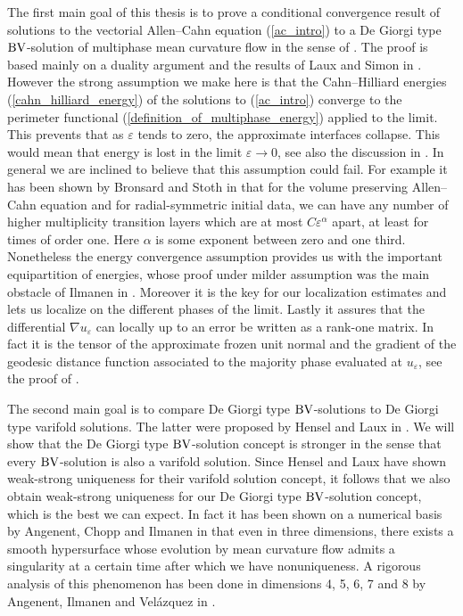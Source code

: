 The first main goal of this thesis is to prove a conditional convergence result 
of solutions to the vectorial Allen--Cahn equation (\ref{ac_intro}) to a De 
Giorgi type $ \operatorname{BV} $-solution of multiphase mean curvature flow in the sense of 
. The proof is based mainly on a duality 
argument and the results of Laux and Simon in 
\cite{convergence_of_allen_cahn_equation_to_multiphase_mean_curvature_flow}.
However the strong assumption we make here is that the Cahn--Hilliard energies 
(\ref{cahn_hilliard_energy}) of the solutions to (\ref{ac_intro}) converge to 
the perimeter functional (\ref{definition_of_multiphase_energy}) applied to the 
limit. 
This prevents that as $ \varepsilon $ tends to zero, the approximate interfaces 
collapse. This would mean that energy is lost in the limit $ \varepsilon \to 0 
$, see also the discussion in
.  In general we are 
inclined to believe that this assumption could fail. For example it has been 
shown by Bronsard and Stoth in 
\cite{bronsard_stoth_on_the_existence_of_high_multiplicity_interfaces}
that for the volume preserving Allen--Cahn equation and for radial-symmetric 
initial data, we can have any number of higher 
multiplicity transition layers which are at most $ C \varepsilon^{ \alpha } $ 
apart, at least for times of order one.
Here $ \alpha $ is some exponent between zero and one third.
Nonetheless the energy 
convergence assumption provides us with the important equipartition of 
energies, whose proof under milder assumption was the main obstacle of Ilmanen 
in \cite{ilmanen_convergence_of_ac_to_brakkes_mcf}. Moreover it is the key for 
our localization estimates and lets us localize on the different phases of the 
limit. Lastly it assures that the differential $ \nabla u_{ 
\varepsilon } $ can locally up to an error be written as a rank-one matrix. In 
fact it
is the tensor of the approximate frozen unit normal and the gradient of the 
geodesic 
distance function associated to the majority phase evaluated at $ u_{ 
\varepsilon } $, see the proof of .

The second main goal is to compare De Giorgi type $ \operatorname{BV} $-solutions to De 
Giorgi type varifold solutions.
The latter were 
proposed by Hensel and Laux in 
\cite{hensel_laux_varifold_solution_concept_for_mean_curvature_flow}. We will 
show that the De Giorgi type $ \operatorname{BV} $-solution concept is stronger in the sense 
that every $ \operatorname{BV} 
$-solution is also a varifold solution. 
Since Hensel and Laux have shown 
weak-strong uniqueness for their varifold solution concept, it follows that we 
also obtain weak-strong uniqueness for our De Giorgi type $ \operatorname{BV} $-solution 
concept, which is the best we can expect. 
In fact it has been shown on a 
numerical basis by Angenent, Chopp and Ilmanen in 
\cite{angenent_chopp_ilmanen_a_computed_example_of_nonuniqueness_of_mcf}
that even in three dimensions, there exists a smooth hypersurface whose 
evolution by 
mean curvature 
flow admits a singularity at a certain time after which we have nonuniqueness. 
A rigorous analysis of this phenomenon has been done in dimensions 4, 5, 6, 7 
and 8 by Angenent, Ilmanen and Velázquez in 
\cite{angenent_ilmanen_velázquez_fattening_from_smooth_initial_data_in_mcf}.


